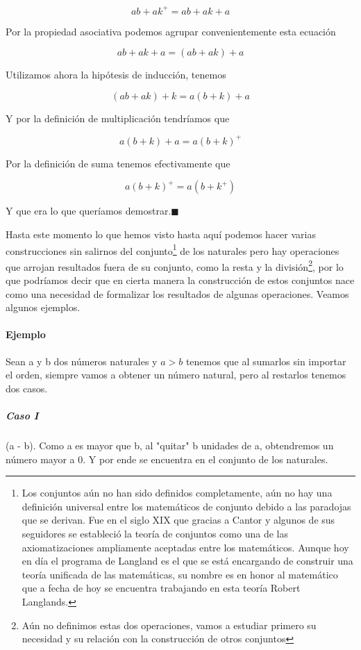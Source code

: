 \documentclass{article}
\begin{document}
$$ab + ak^+ = ab + ak + a$$

Por la propiedad asociativa podemos agrupar convenientemente esta ecuación

$$ab + ak + a = (ab + ak) + a$$

Utilizamos ahora la hipótesis de inducción, tenemos

$$(ab + ak) + k = a(b + k) + a$$

Y por la definición de multiplicación tendríamos que 

$$a(b + k) + a = a(b + k)^+$$

Por la definición de suma tenemos efectivamente que 

$$a(b + k)^+ = a(b + k^+)$$

Y que era lo que queríamos demostrar.$\blacksquare$

Hasta este momento lo que hemos visto hasta aquí podemos hacer varias construcciones sin salirnos del conjunto\footnote{Los conjuntos aún no han sido definidos completamente, aún no hay una definición universal entre los matemáticos de conjunto debido a las paradojas que se derivan. Fue en el siglo XIX que gracias a Cantor y algunos de sus seguidores se estableció la teoría de conjuntos como una de las axiomatizaciones ampliamente aceptadas entre los matemáticos. Aunque hoy en día el programa de Langland es el que se está encargando de construir una teoría unificada de las matemáticas, su nombre es en honor al matemático que a fecha de hoy se encuentra trabajando en esta teoría Robert Langlands.} de los naturales pero hay operaciones que arrojan resultados fuera de su conjunto, como la resta y la división\footnote{Aún no definimos estas dos operaciones, vamos a estudiar primero su necesidad y su relación con la construcción de otros conjuntos}, por lo que podríamos decir que en cierta manera la construcción de estos conjuntos nace como una necesidad de formalizar los resultados de algunas operaciones. Veamos algunos ejemplos.

\paragraph{Ejemplo} Sean a y b dos números naturales y $a > b$ tenemos que al sumarlos sin importar el orden, siempre vamos a obtener un número natural, pero al restarlos tenemos dos casos.

\subparagraph{Caso I} (a - b). Como a es mayor que b, al "quitar" b unidades de a, obtendremos un número mayor a 0. Y por ende se encuentra en el conjunto de los naturales.
\end{document}
